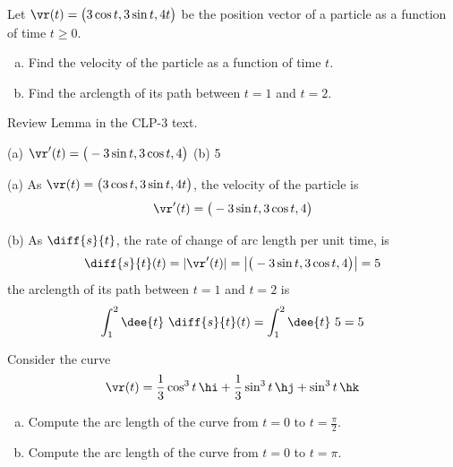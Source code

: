 \begin{question}[M317 2010D]  %
Let $\vr(t) = \big(3 \cos t, 3 \sin t, 4t\big)$ be the position vector 
of a particle as a function of time $t \ge 0$.
\begin{enumerate}[(a)]
\item
Find the velocity of the particle as a function of time $t$.
\item
Find the arclength of its path between $t = 1$ and $t = 2$.
\end{enumerate}
\end{question}

\begin{hint} 
Review Lemma  in the CLP-3 text.
\end{hint}

\begin{answer} 
(a) $\vr'(t) = \big(-3 \sin t, 3 \cos t, 4\big)$\qquad
(b) 5
\end{answer}

\begin{solution} (a) As $\vr(t) = \big(3 \cos t, 3 \sin t, 4t\big)$,
the velocity of the particle is
\begin{equation*}
\vr'(t) = \big(-3 \sin t, 3 \cos t, 4\big)
\end{equation*}

\noindent (b) As $\diff{s}{t}$, the rate of change of arc length per unit time,
is
\begin{equation*}
\diff{s}{t}(t) = |\vr'(t)| = \big|\big(-3 \sin t, 3 \cos t, 4\big)\big|
  =5
\end{equation*}
the arclength of its path between $t = 1$ and $t = 2$ is
\begin{equation*}
\int_1^2\dee{t}\ \diff{s}{t}(t) 
=\int_1^2\dee{t}\ 5
=5
\end{equation*}
\end{solution}


\begin{question}[M317 2007A] %
	Consider the curve
	\begin{equation*}
	\vr(t) = \frac{1}{3}\cos^3 t\,\hi +\frac{1}{3} \sin^3 t\,\hj + \sin^3 t\,\hk
	\end{equation*}
	\begin{enumerate}[(a)]
		\item
		Compute the arc length of the curve from $t = 0$ to $t = \frac{\pi}{2}$.
		\item
		Compute the arc length of the curve from $t = 0$ to $t = \pi$.
	\end{enumerate}
\end{question}

